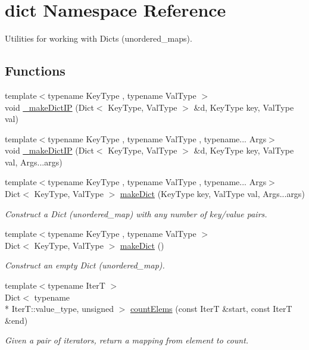 \hypertarget{namespacedict}{\section{dict Namespace Reference}
\label{namespacedict}
}


Utilities for working with {\ttfamily Dict}s ({\ttfamily unordered\-\_\-map}s).  


\subsection*{Functions}
\begin{DoxyCompactItemize}
\item 
{\footnotesize template$<$typename Key\-Type , typename Val\-Type $>$ }\\void \hyperlink{namespacedict_a25162c2329cb972f58b47a93f589d035}{\-\_\-make\-Dict\-I\-P} (Dict$<$ Key\-Type, Val\-Type $>$ \&d, Key\-Type key, Val\-Type val)
\item 
{\footnotesize template$<$typename Key\-Type , typename Val\-Type , typename... Args$>$ }\\void \hyperlink{namespacedict_aedf2cd76600afc0853ea6de895316ff9}{\-\_\-make\-Dict\-I\-P} (Dict$<$ Key\-Type, Val\-Type $>$ \&d, Key\-Type key, Val\-Type val, Args...\-args)
\item 
{\footnotesize template$<$typename Key\-Type , typename Val\-Type , typename... Args$>$ }\\Dict$<$ Key\-Type, Val\-Type $>$ \hyperlink{namespacedict_a60d2673f89ed278333138def4ba2a751}{make\-Dict} (Key\-Type key, Val\-Type val, Args...\-args)
\begin{DoxyCompactList}\small\item\em Construct a {\ttfamily Dict} ({\ttfamily unordered\-\_\-map}) with any number of key/value pairs. \end{DoxyCompactList}\item 
{\footnotesize template$<$typename Key\-Type , typename Val\-Type $>$ }\\Dict$<$ Key\-Type, Val\-Type $>$ \hyperlink{namespacedict_a17c1d6c185319ab58f9854244fdc7b75}{make\-Dict} ()
\begin{DoxyCompactList}\small\item\em Construct an empty {\ttfamily Dict} ({\ttfamily unordered\-\_\-map}). \end{DoxyCompactList}\item 
{\footnotesize template$<$typename Iter\-T $>$ }\\Dict$<$ typename \\*
Iter\-T\-::value\-\_\-type, unsigned $>$ \hyperlink{namespacedict_a0a95e9cde2e3b78db4cbacd7ec00934f}{count\-Elems} (const Iter\-T \&start, const Iter\-T \&end)
\begin{DoxyCompactList}\small\item\em Given a pair of iterators, return a mapping from element to count. \end{DoxyCompactList}\end{DoxyCompactItemize}


